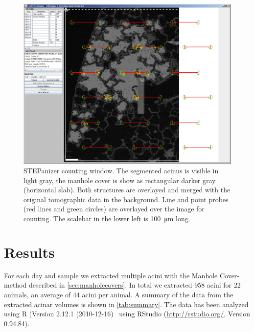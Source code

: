 \documentclass[%
	paper=a4,%
	DIV=calc,%
	twoside=true,%
	abstract=true,%
	]{scrartcl}
\newcommand{\imsize}{\linewidth}
\begin{document}
\renewcommand{\imsize}{\linewidth}
\begin{figure}
	\centering
	\includegraphics[width=\imsize]{img/CountingWindowSTEPanizer}
	\caption{STEPanizer counting window. The segmented acinus is visible in light gray, the manhole cover is show as rectangular darker gray (horizontal slab). Both structures are overlayed and merged with the original tomographic data in the background. Line and point probes (red lines and green circles) are overlayed over the image for counting. The  scalebar in the lower left is \SI{100}{\micro\meter} long.}
	\label{fig:STEPanizer}
\end{figure}

\section{Results\label{sec:Results}}
For each day and sample we extracted multiple acini with the Manhole Cover-method described in \autoref{sec:manholecovers}. In total we extracted 958 acini for 22 animals, an average of 44 acini per animal. A summary of the data from the extracted acinar volumes is shown in \autoref{tab:summary}. The data has been analyzed using R (Version 2.12.1 (2010-12-16)~\cite{R} using RStudio (\url{http://rstudio.org/}, Version 0.94.84).
\end{document}
